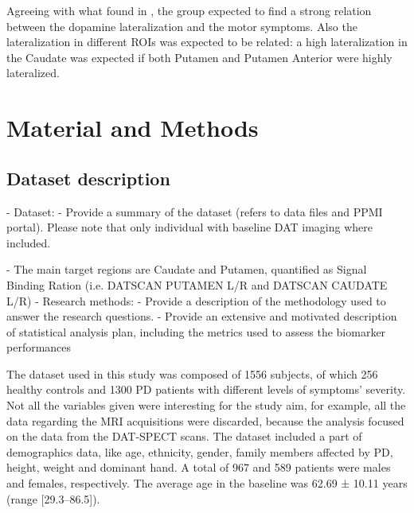 \documentclass[]{article}
\begin{document}
\begin{multicols}{2}
\newline
Agreeing with what found in \cite{pirker_correlation_2003}, the group expected to find a strong relation between the dopamine lateralization and the motor symptoms. Also the lateralization in different ROIs was expected to be related: a high lateralization in the Caudate was expected if both Putamen and Putamen Anterior were highly lateralized. 

\section{Material and Methods}

\subsection{Dataset description}

- Dataset:
\newline
	- Provide a summary of the dataset (refers to data files and PPMI
	portal). Please note that only individual with baseline DAT imaging 
	where included.
\newline

	- The main target regions are Caudate and Putamen, quantified as 
	Signal Binding Ration (i.e. DATSCAN PUTAMEN L/R and 
	DATSCAN CAUDATE L/R)
\newline
- Research methods:
\newline
	- Provide a description of the methodology used to answer the research 
	questions. 
	\newline
	- Provide an extensive and motivated description of statistical analysis plan, including the metrics used to assess the biomarker 
	performances
	
The dataset used in this study was composed of 1556 subjects, of which 256 healthy controls and 1300 PD patients with different levels of symptoms' severity. Not all the variables given were interesting for the study aim, for example, all the data regarding the MRI acquisitions were discarded, because the analysis focused on the data from the DAT-SPECT scans. 
\newline
The dataset included a part of demographics data, like age, ethnicity, gender, family members affected by PD, height, weight and dominant hand.
A total of 967 and 589 patients were males and females, respectively. The average age in the baseline was 62.69 ± 10.11 years (range [29.3–86.5]). 


\end{multicols}
\end{document}
